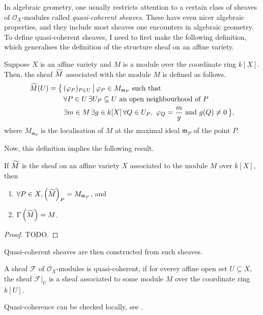In algebraic geometry, one usually restricts attention to a certain class of
sheaves of $\mathscr{O}_{X}$-modules called \emph{quasi-coherent sheaves}.
These have even nicer algebraic properties, and they include most sheaves
one encounters in algebraic geometry. To define quasi-coherent sheaves,
I need to first make the following definition, which generalises the
definition of the structure sheaf on an affine variety.
\begin{defin}
  Suppose $X$ is an affine variety and $M$ is a module over the coordinate
  ring $k[X]$. Then, the sheaf $\widetilde{M}$ associated with the module $M$ is
  defined as follows.
  \begin{align*}
    \widetilde{M}(U)=\big\{\,
    & (\varphi_{P})_{P\in U}\,\big\vert\, \varphi_{P}\in M_{\mathfrak{m}_{P}}
      \text{ such that} \\
    & \forall P\in U\,
      \exists U_{P}\subseteq U\text{ an open neighbourhood of }P \\
    & \exists m\in M\,\exists g\in k[X]\,
    \forall Q\in U_{P},\ \varphi_{Q}=\frac{m}g\text{ and } g(Q)\neq 0\,\big\},
  \end{align*}
  where $M_{\mathfrak{m}_{P}}$ is the localisation of $M$ at the maximal ideal
  $\mathfrak{m}_{P}$ of the point $P$.
\end{defin}
Now, this definition implies the following result.
\begin{lemm}\label{lemm:qcoh_local_global}
  If $\widetilde{M}$ is the sheaf on an affine variety $X$ associated to the module
  $M$ over $k[X]$, then
  \begin{enumerate}[label=\normalfont(\alph*)]
    \item $\forall P\in X, \left(\widetilde{M}\right)_{P}=M_{\mathfrak{m}_{P}}$, and
    \item $\Gamma\left(\widetilde{M}\right)=M$.
  \end{enumerate}
\end{lemm}
\begin{proof}
  TODO.
\end{proof}
Quasi-coherent sheaves are then constructed from such sheaves.
\begin{defin}
  A sheaf $\mathscr{F}$ of $\mathscr{O}_{X}$-modules is quasi-coherent, if
  for everey affine open set $U\subseteq X$, the sheaf $\mathscr{F}\vert_{U}$
  is a sheaf associated to some module $M$ over the coordinate ring $k[U]$.
\end{defin}
\begin{rem}
  Quasi-coherence can be checked locally, see \cite{gathmann}.
\end{rem}
